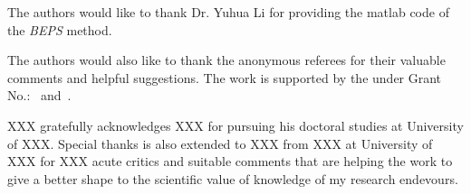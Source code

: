 \begin{acks}

  The authors would like to thank Dr. Yuhua Li for providing the
  matlab code of  the \textit{BEPS} method.

  The authors would also like to thank the anonymous referees for
  their valuable comments and helpful suggestions. The work is
  supported by the  under Grant
  No.:~
  and~.

    XXX gratefully acknowledges XXX for pursuing his doctoral studies at
    University of XXX. Special thanks is also extended to XXX from XXX at
    University of XXX for XXX
    acute critics and suitable comments that are helping the work to give a better
    shape to the scientific value of knowledge of my research endevours.


\end{acks}

